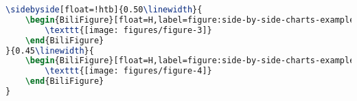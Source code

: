 \begin{lstlisting}[language=LaTeX, caption=Side-by-Side Charts Example, label=listing:side-by-side-charts-example]
\sidebyside[float=!htb]{0.50\linewidth}{
    \begin{BiliFigure}[float=H,label=figure:side-by-side-charts-example-1]{Relationship between $K_0$, $I_p$ and OCR}{$K_0$,$I_p$和OCR之间的关系}
        \texttt{[image: figures/figure-3]}
    \end{BiliFigure}
}{0.45\linewidth}{
    \begin{BiliFigure}[float=H,label=figure:side-by-side-charts-example-2]{Trianguler classification chart}{三角分类图}
        \texttt{[image: figures/figure-4]}
    \end{BiliFigure}
}
\end{lstlisting}

